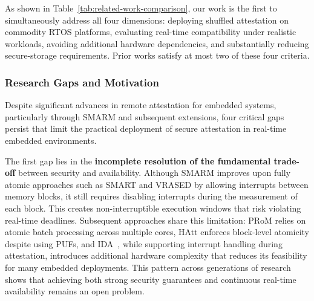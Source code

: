 \documentclass[a4paper,10pt]{article}
\begin{document}
{{\begin{table}[h]
\centering
\caption{Comparison of shuffled-measurement remote attestation schemes.
$\checkmark$ = satisfied, $\times$ = not satisfied.}
\label{tab:related-work-comparison}
\end{table}

As shown in Table~\ref{tab:related-work-comparison}, our work is the first 
to simultaneously address all four dimensions: deploying shuffled attestation on 
commodity RTOS platforms, evaluating real-time compatibility under realistic 
workloads, avoiding additional hardware dependencies, and substantially reducing 
secure-storage requirements. Prior works satisfy at most two of these four criteria.


\subsubsection{Research Gaps and Motivation}
Despite significant advances in remote attestation for embedded systems, particularly through SMARM and subsequent extensions, four critical gaps persist that limit the practical deployment of secure attestation in real-time embedded environments.  


The first gap lies in the \textbf{incomplete resolution of the fundamental trade-off} between security and availability. Although SMARM improves upon fully atomic approaches such as SMART and VRASED by allowing interrupts between memory blocks, it still requires disabling interrupts during the measurement of each block. This creates non-interruptible execution windows that risk violating real-time deadlines. Subsequent approaches share this limitation: PRoM relies on atomic batch processing across multiple cores, HAtt enforces block-level atomicity despite using PUFs, and IDA~\cite{ida2024}, while supporting interrupt handling during attestation, introduces additional hardware complexity that reduces its feasibility for many embedded deployments. This pattern across generations of research shows that 
achieving both strong security guarantees and continuous 
real-time availability remains an open problem.


}}
\end{document}
